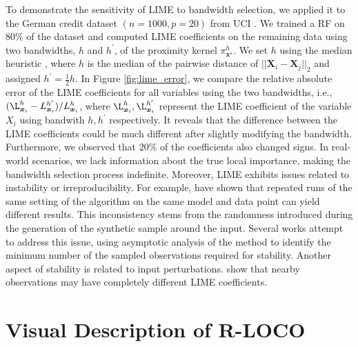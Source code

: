 \documentclass{article}
\newcommand\X{\boldsymbol{X}}
\newcommand\x{\boldsymbol{x}}
\theoremstyle{plain}
\theoremstyle{definition}
\theoremstyle{remark}
\newcommand{\ours}{\textcolor{ours}{\textbf{R-LOCO}}}
\begin{document}
To demonstrate the sensitivity of LIME to bandwidth selection, we applied it to the German credit dataset $(n=1000, p=20)$ from UCI \citep{uci_dataset}. We trained a RF on $80\%$ of the dataset and computed LIME coefficients on the remaining data using two bandwidths, $h$ and $h^\prime$, of the proximity kernel $\pi_{\x^\star}^h$. We set $h$ using the median heuristic \citep{fukumizu2009kernel, flaxman2016bayesian, garreau2017large}, where $h$ is the median of the pairwise distance of $||\X_i - \X_j||_2$ and assigned $h^\prime = \frac{1}{2} h$. In Figure \ref{fig:lime_error}, we compare the relative absolute error of the LIME coefficients for all variables using the two bandwidths, i.e., $(\L_{\x_i}^{h} - L_{\x_i}^{h^\prime})/L_{\x_i}^{h}$, where $\L_{\x_i}^{h}, \L_{\x_i}^{h^\prime}$ represent the LIME coefficient of the variable $X_i$ using bandwith $h, h^\prime$ respectively. It reveals that the difference between the LIME coefficients could be much different after slightly modifying the bandwidth. Furthermore, we observed that $20\%$ of the coefficients also changed signs. In real-world scenarios, we lack information about the true local importance, making the bandwidth selection process indefinite. Moreover, LIME exhibits issues related to instability or irreproducibility. For example, \cite{zhang2019should, Zafar2019DLIMEAD, Visani2020OptiLIMEOL} have shown that repeated runs of the same setting of the algorithm on the same model and data point can yield different results. This inconsistency stems from the randomness introduced during the generation of the synthetic sample around the input. Several works \citep{Zafar2019DLIMEAD, Zhou2021SLIMESF} attempt to address this issue, using asymptotic analysis of the method to identify the minimum number of the sampled observations required for stability. Another aspect of stability is related to input perturbations. \cite{alvarez2018robustness} show that nearby observations may have completely different LIME coefficients.

\section{Visual Description of \ours{}}
\end{document}
